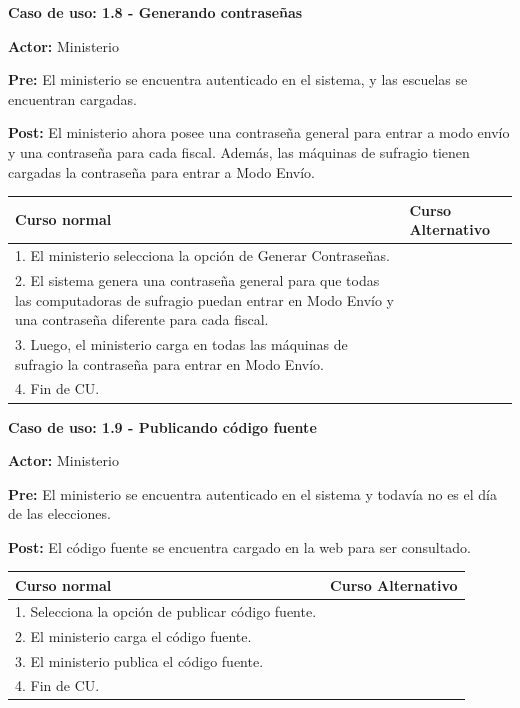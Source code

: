 \textbf{Caso de uso: 1.8 - Generando contraseñas}

\textbf{Actor:} Ministerio

\textbf{Pre:} El ministerio se encuentra autenticado en el sistema, y las escuelas se encuentran cargadas.

\textbf{Post:} El ministerio ahora posee una contraseña general para entrar a modo envío y una contraseña para cada fiscal. Además, las máquinas de sufragio tienen cargadas la contraseña para entrar a Modo Envío.

\begin{table}[h!]
	
 \begin{tabular}{|p{7.5cm} | p{7.5cm}|} 
 \hline
 \textbf{Curso normal} & \textbf{Curso Alternativo} \\
 \hline

1. El ministerio selecciona la opción de Generar Contraseñas. & \\
\hline

2. El sistema genera una contraseña general para que todas las computadoras de sufragio puedan entrar en Modo Envío y una contraseña diferente para cada fiscal. & \\
\hline

3. Luego, el ministerio carga en todas las máquinas de sufragio la contraseña para entrar en Modo Envío. & \\
\hline

4. Fin de CU. & \\
\hline

\end{tabular}
\end{table}
\textbf{Caso de uso: 1.9 - Publicando código fuente}

\textbf{Actor:} Ministerio

\textbf{Pre:} El ministerio se encuentra autenticado en el sistema y todavía no es el día de las elecciones.

\textbf{Post:} El código fuente se encuentra cargado en la web para ser consultado. 

\newpage

\begin{table}[h!]
	
 \begin{tabular}{|p{7.5cm} | p{7.5cm}|} 
 \hline
 \textbf{Curso normal} & \textbf{Curso Alternativo} \\
 \hline
 
1. Selecciona la opción de publicar código fuente. & \\
\hline

2. El ministerio carga el código fuente. & \\
\hline

3. El ministerio publica el código fuente. & \\
\hline

4. Fin de CU. & \\
\hline
\end{tabular}
\end{table}

